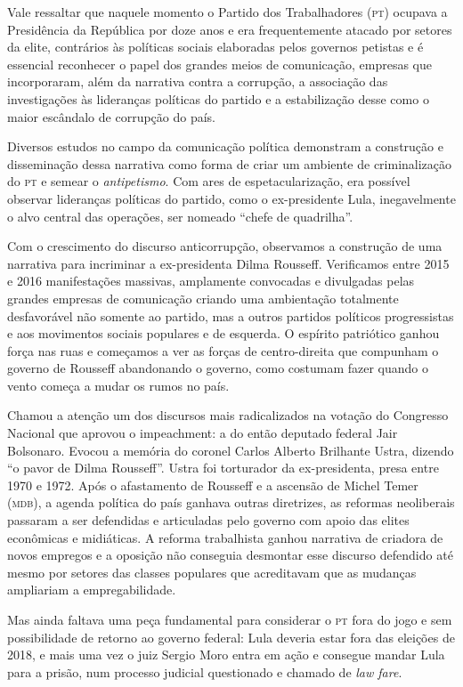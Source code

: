 Vale ressaltar que naquele momento o Partido dos Trabalhadores (\textsc{pt})
ocupava a Presidência da República por doze anos e era frequentemente
atacado por setores da elite, contrários às políticas sociais elaboradas
pelos governos petistas e é essencial reconhecer o papel dos grandes
meios de comunicação, empresas que incorporaram, além da narrativa contra
a corrupção, a associação das investigações às lideranças políticas
do partido e a estabilização desse como o maior escândalo de corrupção do
país.

Diversos estudos no campo da comunicação política demonstram a
construção e disseminação dessa narrativa como forma de criar um
ambiente de criminalização do \textsc{pt} e semear o
\textit{antipetismo}. Com ares de espetacularização, era possível observar
lideranças políticas do partido, como o ex-presidente Lula, inegavelmente o alvo
central das operações, ser nomeado ``chefe de quadrilha''.

Com o crescimento do discurso anticorrupção, observamos a construção de
uma narrativa para incriminar a ex-presidenta Dilma Rousseff. 
Verificamos entre 2015 e 2016 manifestações massivas, amplamente
convocadas e divulgadas pelas grandes empresas de comunicação criando
uma ambientação totalmente desfavorável não somente ao partido, mas a
outros partidos políticos progressistas e aos movimentos sociais
populares e de esquerda. O espírito patriótico ganhou força nas ruas e
começamos a ver as forças de centro-direita que compunham o governo de
Rousseff abandonando o governo, como costumam fazer quando o vento
começa a mudar os rumos no país.

Chamou a atenção um dos discursos mais radicalizados na votação do
Congresso Nacional que aprovou o impeachment: a do então deputado
federal Jair Bolsonaro. Evocou a memória do coronel Carlos Alberto
Brilhante Ustra, dizendo ``o pavor de Dilma Rousseff''. Ustra foi
torturador da ex-presidenta, presa entre 1970 e 1972. Após o afastamento
de Rousseff e a ascensão de Michel Temer (\textsc{mdb}), a agenda política do país
ganhava outras diretrizes, as reformas neoliberais passaram a ser
defendidas e articuladas pelo governo com apoio das elites econômicas e
midiáticas. A reforma trabalhista ganhou narrativa de criadora de novos
empregos e a oposição não conseguia desmontar esse discurso defendido
até mesmo por setores das classes populares que acreditavam que as
mudanças ampliariam a empregabilidade.

Mas ainda faltava uma peça fundamental para considerar o \textsc{pt} fora do jogo
e sem possibilidade de retorno ao governo federal: Lula deveria estar
fora das eleições de 2018, e mais uma vez o juiz Sergio Moro entra em
ação e consegue mandar Lula para a prisão, num processo judicial
questionado e chamado de \textit{law fare}.

